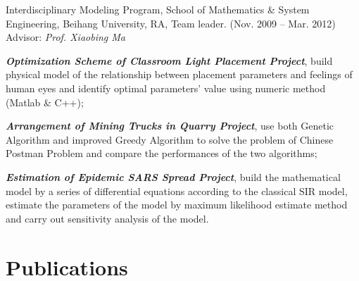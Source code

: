 \documentclass[10pt,letterpaper]{article}
\renewenvironment{itemize}{
  \begin{list}{}{
    \setlength{\leftmargin}{1.5em}
    \setlength{\itemsep}{0.25em}
    \setlength{\parskip}{0pt}
    \setlength{\parsep}{0.25em}
  }
}{
  \end{list}
}
\begin{document}
\begin{itemize}
  \item Interdisciplinary Modeling Program, School of Mathematics \& System Engineering, Beihang University, RA, Team leader. (Nov. 2009 -- Mar. 2012) \\
    Advisor: \textit{Prof. Xiaobing Ma}
  \begin{itemize}
    \item \textbf{\textit{Optimization Scheme of Classroom Light Placement Project}}, build physical model of the relationship between placement parameters and feelings of human eyes and identify optimal parameters' value using numeric method (Matlab \& C++);
    \item \textit{\textbf{Arrangement of Mining Trucks in Quarry Project}}, use both Genetic Algorithm and improved Greedy Algorithm to solve the problem of Chinese Postman Problem and compare the performances of the two algorithms;
    \item \textbf{\textit{Estimation of Epidemic SARS Spread Project}}, build the mathematical model by a series of differential equations according to the classical SIR model, estimate the parameters of the model by maximum likelihood estimate method and carry out sensitivity analysis of the model.
  \end{itemize}
\end{itemize}

\newpage
\section*{Publications}
\end{document}
